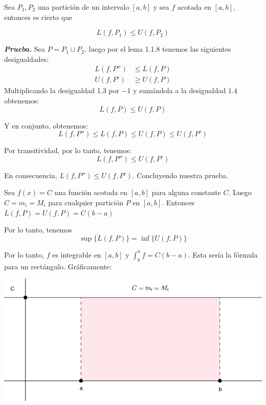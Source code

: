 \documentclass{report}
\begin{document}
    \begin{thBox}
        Sea $P_1, P_2$ una partición de un intervalo $[a,b]$ y sea $f$ acotada en $[a,b]$, entonces es cierto que

        $$L(f, P_1) \leq U(f, P_2)$$
    \end{thBox}

    \textit{\textbf{Prueba.}} Sea $P = P_1 \cup P_2$, luego por el lema 1.1.8 tenemos las siguientes desigualdades:
    \begin{align}
        L(f, P'') &\leq L(f, P)\\
        U(f, P') &\geq U(f, P)
    \end{align}
    Multiplicando la desigualdad 1.3 por $-1$ y sumándola a la desigualdad $1.4$ obtenemos:
    $$
        L(f, P) \leq U(f, P)
    $$

    Y en conjunto, obtenemos:
    $$
        L(f, P'') \leq L(f, P) \leq U(f, P) \leq U(f, P')
    $$

    Por transitividad, por lo tanto, tenemos:
    $$
        L(f, P'') \leq U(f, P')
    $$

    En consecuencia, $L(f, P'') \leq U(f, P')$. Concluyendo nuestra prueba.

    \begin{Example}
        Sea $f(x) = C$ una función acotada en $[a,b]$ para alguna constante $C$. Luego $C = m_i = M_i$ para cualquier partición $P$ en $[a,b]$. Entonces
        $L(f, P) = U(f, P) = C(b-a)$

        Por lo tanto, tenemos
        $$\sup\{L(f, P)\} = \inf\{U(f, P)\}$$

        Por lo tanto, $f$ es integrable en $[a,b]$ y $\int_{b}^{a}f = C(b-a)$. Esta sería la fórmula para un rectángulo. Gráficamente:

        \begin{center}
            \includegraphics[width=1\textwidth]{images/integralconstant.png}
        \end{center}
    \end{Example}
\end{document}
